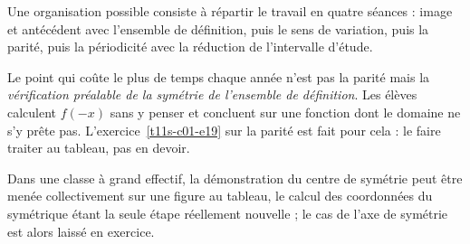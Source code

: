 \begin{notepourlaclasse}
Une organisation possible consiste à répartir le travail en quatre séances : image et antécédent avec l'ensemble de définition, puis le sens de
variation, puis la parité, puis la périodicité avec la réduction de
l'intervalle d'étude.

Le point qui coûte le plus de temps chaque année n'est pas la parité mais la
\emph{vérification préalable de la symétrie de l'ensemble de définition}. Les
élèves calculent $f(-x)$ sans y penser et concluent sur une fonction dont le
domaine ne s'y prête pas. L’exercice~\ref{t11s-c01-e19} sur la parité est fait
pour cela : le faire traiter au tableau, pas en devoir.

Dans une classe à grand effectif, la démonstration du centre de symétrie peut
être menée collectivement sur une figure au tableau, le calcul des
coordonnées du symétrique étant la seule étape réellement nouvelle ; le cas
de l'axe de symétrie est alors laissé en exercice.
\end{notepourlaclasse}

